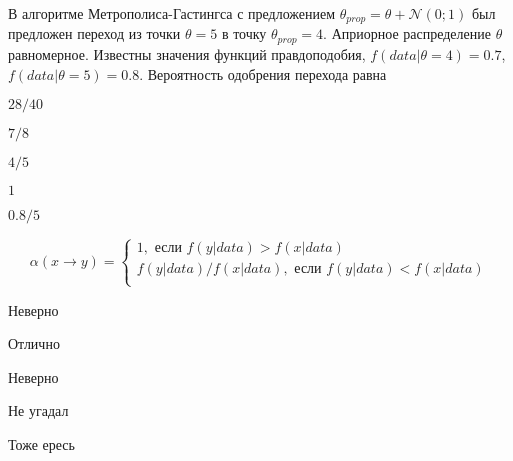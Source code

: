 
\begin{question}
В алгоритме Метрополиса-Гастингса с предложением $\theta_{prop} = \theta + \mathcal N(0;1)$ 
был предложен переход из точки
\(\theta=5\) в точку \(\theta_{prop}=4\). Априорное
распределение \(\theta\) равномерное. Известны значения функций
правдоподобия, \(f(data|\theta=4)=0.7\), \(f(data|\theta=5)=0.8\).
Вероятность одобрения перехода равна
\begin{answerlist}
  \item \(28/40\)
  \item \(7/8\)
  \item \(4/5\)
  \item \(1\)
  \item \(0.8/5\)
\end{answerlist}
\end{question}

\begin{solution}
\[
\alpha(x \to y) = \begin{cases}
1, \text{ если } f(y|data) > f(x|data) \\
f(y|data) / f(x|data), \text{ если } f(y|data) < f(x|data) \\
\end{cases}
\]
\begin{answerlist}
  \item Неверно
  \item Отлично
  \item Неверно
  \item Не угадал
  \item Тоже ересь
\end{answerlist}
\end{solution}

